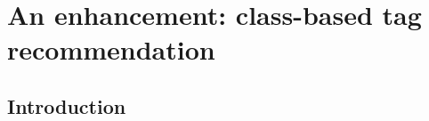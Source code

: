 
\chapter[An enhancement: class-based tag recommendation][An enhancement: class-based tag rec.]{An enhancement: class-based tag recommendation}
\label{sec:class}

\section{Introduction}
\label{sec:class:introduction}


